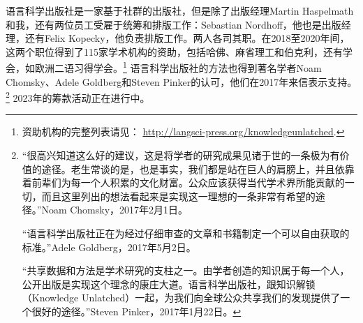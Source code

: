 语言科学出版社是一家基于社群的出版社，但是除了出版经理Martin Haspelmath和我，还有两位员工受雇于统筹和排版工作：Sebastian Nordhoff，他也是出版经理，还有Felix Kopecky，他负责排版工作。两人各司其职。在2018至2020年间，这两个职位得到了115家学术机构的资助，包括哈佛、麻省理工和伯克利，还有学会，如欧洲二语习得学会。\footnote{%
 资助机构的完整列表请见： 
  \url{http://langsci-press.org/knowledgeunlatched}.
} 语言科学出版社的方法也得到著名学者Noam Chomsky、Adele Goldberg和Steven Pinker的认可，他们在2017年来信表示支持。
\footnote{%
“很高兴知道这么好的建议，这是将学者的研究成果见诸于世的一条极为有价值的途径。老生常谈的是，也是事实，我们都是站在巨人的肩膀上，并且依靠着前辈们为每一个人积累的文化财富。公众应该获得当代学术界所能贡献的一切，而且这里列出的想法看起来是实现这一理想的一条非常有希望的途径。”Noam Chomsky，2017年2月1日。

“语言科学出版社正在为经过仔细审查的文章和书籍制定一个可以自由获取的标准。”Adele Goldberg，2017年5月2日。

“共享数据和方法是学术研究的支柱之一。由学者创造的知识属于每一个人，公开出版是实现这个理念的康庄大道。语言科学出版社，跟知识解锁（Knowledge Unlatched）一起，为我们向全球公众共享我们的发现提供了一个很好的途径。”Steven Pinker，2017年1月22日。
} 2023年的筹款活动正在进行中。
%

